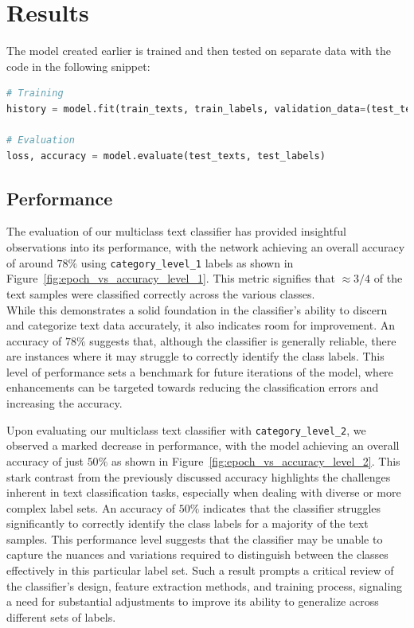 \section{Results}
The model created earlier is trained and then tested on separate data with the code in the following snippet:
\begin{lstlisting}[language=Python]
# Training
history = model.fit(train_texts, train_labels, validation_data=(test_texts, test_labels), epochs=epochs, batch_size=batch_size, use_multiprocessing=True)

# Evaluation
loss, accuracy = model.evaluate(test_texts, test_labels)
\end{lstlisting}

\subsection{Performance}

The evaluation of our multiclass text classifier has provided insightful observations into its performance, with the network achieving an overall accuracy of around $78\%$ using \verb|category_level_1| labels as shown in Figure~\ref{fig:epoch_vs_accuracy_level_1}.
This metric signifies that $\approx 3/4$ of the text samples were classified correctly across the various classes.\\
While this demonstrates a solid foundation in the classifier's ability to discern and categorize text data accurately, it also indicates room for improvement.
An accuracy of $78\%$ suggests that, although the classifier is generally reliable, there are instances where it may struggle to correctly identify the class labels.
This level of performance sets a benchmark for future iterations of the model, where enhancements can be targeted towards reducing the classification errors and increasing the accuracy.

Upon evaluating our multiclass text classifier with \verb|category_level_2|, we observed a marked decrease in performance, with the model achieving an overall accuracy of just $50\%$ as shown in Figure~\ref{fig:epoch_vs_accuracy_level_2}. This stark contrast from the previously discussed accuracy highlights the challenges inherent in text classification tasks, especially when dealing with diverse or more complex label sets. An accuracy of $50\%$ indicates that the classifier struggles significantly to correctly identify the class labels for a majority of the text samples. This performance level suggests that the classifier may be unable to capture the nuances and variations required to distinguish between the classes effectively in this particular label set. Such a result prompts a critical review of the classifier’s design, feature extraction methods, and training process, signaling a need for substantial adjustments to improve its ability to generalize across different sets of labels.

